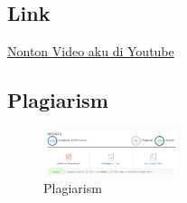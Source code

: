 \subsection{Link}
 \href{https://www.youtube.com/watch?v=vosE98eZ_Io}{Nonton Video aku di Youtube}
\subsection{Plagiarism}
\begin{figure}[H]
	\includegraphics[width=4cm]{figures/1174057/plagiat.png}
	\centering
	\caption{Plagiarism}
\end{figure}
